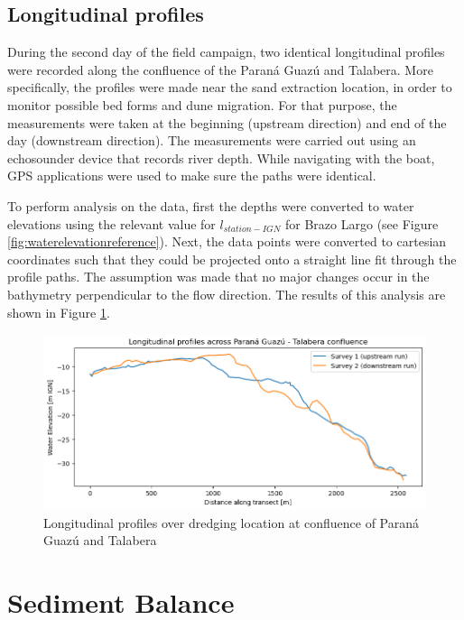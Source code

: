 \subsection{Longitudinal profiles}
During the second day of the field campaign, two identical longitudinal profiles were recorded along the confluence of the Paraná Guazú and Talabera. More specifically, the profiles were made near the sand extraction location, in order to monitor possible bed forms and dune migration. For that purpose, the measurements were taken at the beginning (upstream direction) and end of the day (downstream direction). The measurements were carried out using an echosounder device that records river depth. While navigating with the boat, GPS applications were used to make sure the paths were identical. 

To perform analysis on the data, first the depths were converted to water elevations using the relevant value for $l_{station-IGN}$ for Brazo Largo (see Figure \ref{fig:waterelevationreference}). Next, the data points were converted to cartesian coordinates such that they could be projected onto a straight line fit through the profile paths. The assumption was made that no major changes occur in the bathymetry perpendicular to the flow direction. The results of this analysis are shown in Figure \ref{fig:longitudinal profiles}. 

\begin{figure}[H]
    \centering
    \includegraphics[width=1\linewidth]{figures/ch6/longitudinal profiles.png}
    \caption{Longitudinal profiles over dredging location at confluence of Paraná Guazú and Talabera}
    \label{fig:longitudinal profiles}
\end{figure}


\newpage
\section{Sediment Balance}
\label{sec: Sediment Balance}






